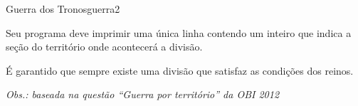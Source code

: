 \documentclass[12pt,a4paper,oneside]{article}
\begin{document}
\begin{problem}{Guerra dos Tronos}{guerra}{2}
\OutputFile

Seu programa deve imprimir uma única linha contendo um inteiro que indica a seção do território onde acontecerá a divisão.

\Notes
É garantido que sempre existe uma divisão que satisfaz as condições dos reinos.

\Example

\begin{example}
%
\end{example}

\begin{example}
%
\end{example}

\small \textit{Obs.: baseada na questão ``Guerra por território'' da OBI 2012} 


\end{problem}
\end{document}
